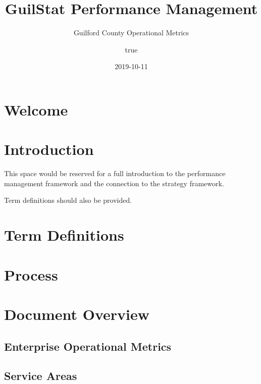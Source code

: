 \documentclass[]{book}
\title{GuilStat Performance Management}
\subtitle{Guilford County Operational Metrics}
\author{true}
\date{2019-10-11}
\begin{document}
\maketitle

{
\setcounter{tocdepth}{1}
\tableofcontents
}
\hypertarget{welcome}{%
\chapter*{Welcome}\label{welcome}}

\hypertarget{introduction}{%
\chapter*{Introduction}\label{introduction}}

This space would be reserved for a full introduction to the performance management framework and the connection to the strategy framework.

Term definitions should also be provided.

\hypertarget{term-definitions}{%
\chapter*{Term Definitions}\label{term-definitions}}

\hypertarget{process}{%
\chapter*{Process}\label{process}}

\hypertarget{document-overview}{%
\chapter*{Document Overview}\label{document-overview}}

\hypertarget{enterprise-operational-metrics}{%
\section*{Enterprise Operational Metrics}\label{enterprise-operational-metrics}}

\hypertarget{service-areas}{%
\section*{Service Areas}\label{service-areas}}
\end{document}

